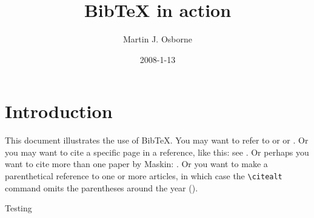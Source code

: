 \documentclass[12pt]{article}
\begin{document}
\title{BibTeX in action}
\author{Martin J. Osborne}
\date{2008-1-13}

\maketitle

\section{Introduction}
This document illustrates the use of BibTeX\@.  You may want to refer to
\cite{boyd2001chebyshev} or \cite{hussaini1983spectral} or \cite{haidvogel1979accurate}.  Or you may want to cite a
specific page in a reference, like this: see \citet[p.~199]{boyd2001chebyshev}.  Or
perhaps you want to cite more than one paper by Maskin: \cite{hussaini1983spectral, haidvogel1979accurate}.
Or you want to make a parenthetical reference to one or more articles, in which case the \verb+\citealt+ command omits the parentheses around the year (\citealt{haidvogel1979accurate}).

Testing \cite{drazin2004hydrodynamic}




\end{document}

